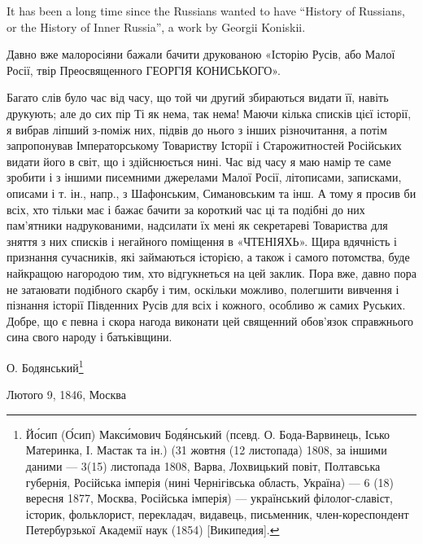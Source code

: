  
 
 
 
 

\begin{zznagolos}
\raggedcolumns
\begin{multicols}{2} %
\setlength{\parindent}{0pt}

It has been a long time since the Russians wanted to have \enquote{History of
Russians, or the History of Inner Russia}, a work by Georgii Koniskii.

Давно вже малоросіяни бажали бачити друкованою «Історію Русів, або Малої Росії,
твір Преосвященного ГЕОРГІЯ КОНИСЬКОГО».

Багато слів було час від часу, що той чи другий збираються видати її, навіть
друкують; але до сих пір Ті як нема, так нема! Маючи кілька списків цієї
історії, я вибрав ліпший з-поміж них, підвів до нього з інших різночитання, а
потім запропонував Імператорському Товариству Історії і Старожитностей
Російських видати його в світ, що і здійснюється нині. Час від часу я маю намір
те саме зробити і з іншими писемними джерелами Малої Росії, літописами,
записками, описами і т. ін., напр., з Шафонським, Симановським та інш.  А тому
я просив би всіх, хто тільки має і бажає бачити за короткий час ці та подібні
до них пам'ятники надрукованими, надсилати їх мені як секретареві Товариства
для зняття з них списків і негайного поміщення в «ЧТЕНІЯХЬ». Щира вдячність і
признання сучасників, які займаються історією, а також і самого потомства, буде
найкращою нагородою тим, хто відгукнеться на цей заклик. Пора вже, давно пора
не затаювати подібного скарбу і тим, оскільки можливо, полегшити вивчення і
пізнання історії Південних Русів для всіх і кожного, особливо ж самих Руських.
Добре, що є певна і скора нагода виконати цей священний обов'язок справжнього
сина свого народу і батьківщини.

О. Бодянський\footnote{%
Йо́сип (О́сип) Макси́мович Бодя́нський (псевд. О. Бода-Варвинець, Ісько
Материнка, І. Мастак та ін.) (31 жовтня (12 листопада) 1808, за іншими
даними — 3(15) листопада 1808, Варва, Лохвицький повіт, Полтавська
губернія, Російська імперія (нині Чернігівська область, Україна) — 6
(18) вересня 1877, Москва, Російська імперія) — український
філолог-славіст, історик, фольклорист, перекладач, видавець, письменник,
член-кореспондент Петербурзької Академії наук (1854) [Википедия].
}

Лютого 9, 1846, Москва

\end{multicols} %
\end{zznagolos}

